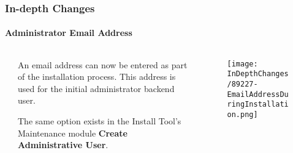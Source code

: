 
\begin{frame}[fragile]
	\frametitle{In-depth Changes}
	\framesubtitle{Administrator Email Address}

	\begin{columns}[T]
		\begin{column}{.04\textwidth}
		\end{column}
		\begin{column}{.38\textwidth}

			An email address can now be entered as part of the installation process.
			This address is used for the initial administrator backend user.

			\vspace{0.2cm}

			The same option exists in the Install Tool's Maintenance module
			\textbf{Create Administrative User}.

		\end{column}
		\begin{column}{.58\textwidth}
			\vspace{-0.3cm}
			\begin{figure}
				\texttt{[image: InDepthChanges/89227-EmailAddressDuringInstallation.png]}
			\end{figure}
		\end{column}
	\end{columns}

\end{frame}


